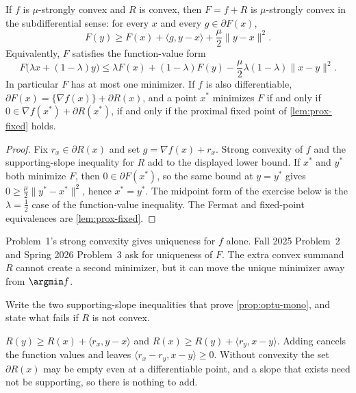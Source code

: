 \begin{proposition}
\label{prop:optu-unique-F}
If $f$ is $\mu$-strongly convex and $R$ is convex, then $F=f+R$ is $\mu$-strongly convex in the subdifferential sense: for every $x$ and every $g\in\partial F(x)$,
\[
F(y)
\ge
F(x)+\langle g,y-x\rangle+\frac\mu2\|y-x\|^2.
\]
Equivalently, $F$ satisfies the function-value form
\[
F\bigl(\lambda x+(1-\lambda)y\bigr)
\le
\lambda F(x)+(1-\lambda)F(y)-\frac\mu2\lambda(1-\lambda)\|x-y\|^2.
\]
In particular $F$ has at most one minimizer. If $f$ is also differentiable, $\partial F(x)=\{\nabla f(x)\}+\partial R(x)$, and a point $x^*$ minimizes $F$ if and only if $0\in\nabla f(x^*)+\partial R(x^*)$, if and only if the proximal fixed point of \cref{lem:prox-fixed} holds.
\end{proposition}

\begin{proof}
Fix $r_x\in\partial R(x)$ and set $g=\nabla f(x)+r_x$. Strong convexity of $f$ and the supporting-slope inequality for $R$ add to the displayed lower bound. If $x^*$ and $y^*$ both minimize $F$, then $0\in\partial F(x^*)$, so the same bound at $y=y^*$ gives $0\ge\frac\mu2\|y^*-x^*\|^2$, hence $x^*=y^*$. The midpoint form of the exercise below is the $\lambda=\frac12$ case of the function-value inequality. The Fermat and fixed-point equivalences are \cref{lem:prox-fixed}.
\end{proof}

\begin{remark}
\label{rem:optu-unique-f-vs-F}
Problem~1's strong convexity gives uniqueness for $f$ alone. Fall 2025 Problem~2 and Spring 2026 Problem~3 ask for uniqueness of $F$. The extra convex summand $R$ cannot create a second minimizer, but it can move the unique minimizer away from $\argmin f$.
\end{remark}

\begin{exercise}
\label{ex:optu-mono}
Write the two supporting-slope inequalities that prove \cref{prop:optu-mono}, and state what fails if $R$ is not convex.
\end{exercise}

\begin{solution}
$R(y)\ge R(x)+\langle r_x,y-x\rangle$ and $R(x)\ge R(y)+\langle r_y,x-y\rangle$. Adding cancels the function values and leaves $\langle r_x-r_y,x-y\rangle\ge 0$. Without convexity the set $\partial R(x)$ may be empty even at a differentiable point, and a slope that exists need not be supporting, so there is nothing to add.
\end{solution}

